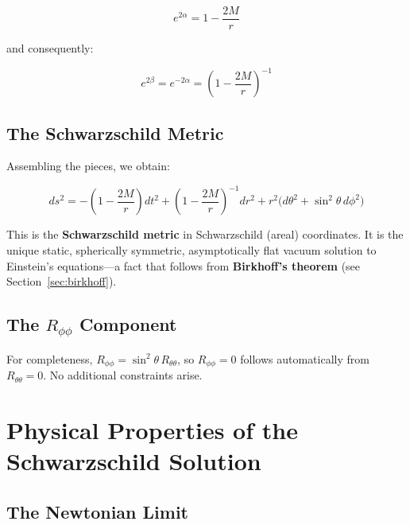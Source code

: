 \documentclass[12pt]{article}
\theoremstyle{definition}
\theoremstyle{remark}
\begin{document}
\begin{equation}
  e^{2\alpha} = 1 - \frac{2M}{r}
\end{equation}

and consequently:

\begin{equation}
  e^{2\beta} = e^{-2\alpha} = \left(1 - \frac{2M}{r}\right)^{-1}
\end{equation}

\subsection{The Schwarzschild Metric}

Assembling the pieces, we obtain:

\begin{equation}\label{eq:schwarzschild-final}
  \boxed{\;
  ds^{2} = -\left(1 - \frac{2M}{r}\right)dt^{2}
           + \left(1 - \frac{2M}{r}\right)^{-1}dr^{2}
           + r^{2}\big(d\theta^{2} + \sin^{2}\theta\,d\phi^{2}\big)
  \;}
\end{equation}

This is the \textbf{Schwarzschild metric} in Schwarzschild (areal) coordinates. It is the unique static, spherically symmetric, asymptotically flat vacuum solution to Einstein's equations---a fact that follows from \textbf{Birkhoff's theorem} (see Section~\ref{sec:birkhoff}).

\subsection{The \texorpdfstring{$R_{\phi\phi}$}{R\_phiphi} Component}

For completeness, $R_{\phi\phi} = \sin^{2}\theta\,R_{\theta\theta}$, so $R_{\phi\phi} = 0$ follows automatically from $R_{\theta\theta} = 0$. No additional constraints arise.

\section{Physical Properties of the Schwarzschild Solution}

\subsection{The Newtonian Limit}\label{sec:newtonian}
\end{document}
